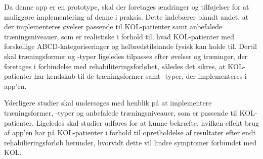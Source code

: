 Da denne app er en prototype, skal der foretages ændringer og tilføjelser for at muliggøre implementering af denne i praksis. Dette indebærer blandt andet, at der implementeres øvelser passende til KOL-patienter samt anbefalede træningsniveauer, som er realistiske i forhold til, hvad KOL-patienter med forskellige ABCD-kategoriseringer og helbredstilstande fysisk kan holde til. Dertil skal træningsformer og -typer ligeledes tilpasses efter øvelser og træninger, der foretages i forbindelse med rehabiliteringsforløbet, således det sikres, at KOL-patienter har kendskab til de træningsformer samt -typer, der implementeres i app’en. 

Yderligere studier skal undersøges med henblik på at implementere træningsformer, -typer og anbefalede træningsniveauer, som er passende til KOL-patienter. Ligeledes skal studier udføres for at kunne bekræfte, hvilken effekt brug af app’en har på KOL-patienter i forhold til opretholdelse af resultater efter endt rehabilieringsforløb herunder, hvorvidt dette vil lindre symptomer forbundet med KOL. 